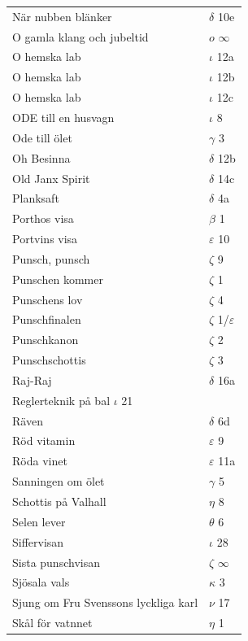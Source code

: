 \documentclass[a6paper,10pt]{article}
\begin{document}
\newpage
\begin{table}[!h]
\begin{tabular}{l l}
När nubben blänker&	$\delta$ 10e\\
O gamla klang och jubeltid&	$o$ $\infty$\\
O hemska lab&	$\iota$ 12a\\
O hemska lab&	$\iota$ 12b\\
O hemska lab&	$\iota$ 12c\\
ODE till en husvagn	&$\iota$ 8\\
Ode till ölet&	$\gamma$ 3\\
Oh Besinna&	$\delta$ 12b\\
Old Janx Spirit&	$\delta$ 14c\\
Planksaft	&$\delta$ 4a\\
Porthos visa&	$\beta$ 1\\
Portvins visa	&$\varepsilon$ 10\\
Punsch, punsch	&$\zeta$ 9\\
Punschen kommer&	$\zeta$ 1\\
Punschens lov&	$\zeta$ 4\\
Punschfinalen	&$\zeta$ 1/$\varepsilon$\\
Punschkanon&	$\zeta$ 2\\
Punschschottis	&$\zeta$ 3\\
Raj-Raj&	$\delta$ 16a\\
Reglerteknik på bal $\iota$ 21\\
Räven&	$\delta$ 6d\\
Röd vitamin	&$\varepsilon$ 9\\
Röda vinet&	$\varepsilon$ 11a\\
Sanningen om ölet&	$\gamma$ 5\\
Schottis på Valhall&	$\eta$ 8\\
Selen lever	&$\theta$ 6\\
Siffervisan &$\iota$ 28\\
Sista punschvisan	&$\zeta$ $\infty$\\
Sjösala vals	&$\kappa$ 3\\
Sjung om Fru Svenssons lyckliga karl&	$\nu$ 17\\
Skål för vatnnet&	$\eta$ 1\\
\end{tabular}
\end{table}
\end{document}
